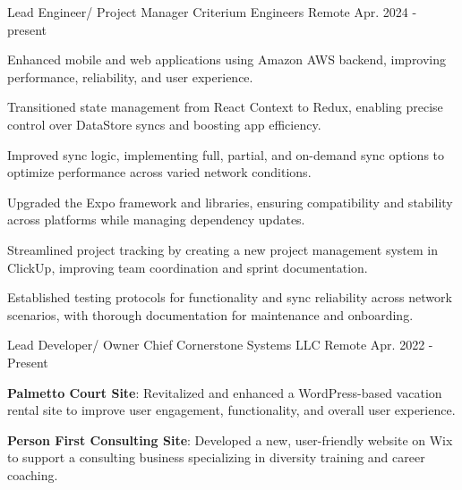 

\begin{cventries}

  \cventry
    {Lead Engineer/ Project Manager} %
    {Criterium Engineers } %
    {Remote} %
    {Apr. 2024 - present} %
    {
      \begin{cvitems} %
        \item {Enhanced mobile and web applications using Amazon AWS backend, improving performance, reliability, and user experience.}
        \item {Transitioned state management from React Context to Redux, enabling precise control over DataStore syncs and boosting app efficiency.}
        \item {Improved sync logic, implementing full, partial, and on-demand sync options to optimize performance across varied network conditions.}
        \item {Upgraded the Expo framework and libraries, ensuring compatibility and stability across platforms while managing dependency updates.}
        \item {Streamlined project tracking by creating a new project management system in ClickUp, improving team coordination and sprint documentation.}
        \item {Established testing protocols for functionality and sync reliability across network scenarios, with thorough documentation for maintenance and onboarding.}
      \end{cvitems}
    }


  \cventry
    {Lead Developer/ Owner} %
    {Chief Cornerstone Systems LLC} %
    {Remote} %
    {Apr. 2022 - Present} %
    {
      \begin{cvitems} %
        \item {\textbf{Palmetto Court Site}: Revitalized and enhanced a WordPress-based vacation rental site to improve user engagement, functionality, and overall user experience.}
        \item {\textbf{Person First Consulting Site}: Developed a new, user-friendly website on Wix to support a consulting business specializing in diversity training and career coaching.}
      \end{cvitems}
    }


\end{cventries}
